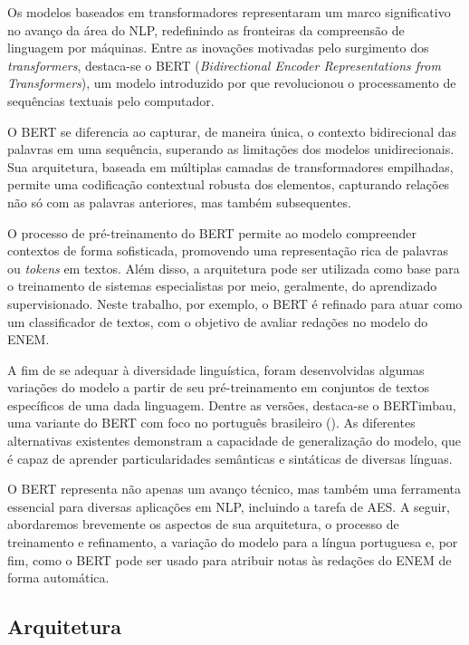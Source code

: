 Os modelos baseados em transformadores representaram um marco significativo no avanço da área do NLP, redefinindo as fronteiras da compreensão de linguagem por máquinas. Entre as inovações motivadas pelo surgimento dos \textit{transformers}, destaca-se o BERT (\textit{Bidirectional Encoder Representations from Transformers}), um modelo introduzido por \citet{bert2018} que revolucionou o processamento de sequências textuais pelo computador.

O BERT se diferencia ao capturar, de maneira única, o contexto bidirecional das palavras em uma sequência, superando as limitações dos modelos unidirecionais. Sua arquitetura, baseada em múltiplas camadas de transformadores empilhadas, permite uma codificação contextual robusta dos elementos, capturando relações não só com as palavras anteriores, mas também subsequentes.

O processo de pré-treinamento do BERT permite ao modelo compreender contextos de forma sofisticada, promovendo uma representação rica de palavras ou \textit{tokens} em textos. Além disso, a arquitetura pode ser utilizada como base para o treinamento de sistemas especialistas por meio, geralmente, do aprendizado supervisionado. Neste trabalho, por exemplo, o BERT é refinado para atuar como um classificador de textos, com o objetivo de avaliar redações no modelo do ENEM.

A fim de se adequar à diversidade linguística, foram desenvolvidas algumas variações do modelo a partir de seu pré-treinamento em conjuntos de textos específicos de uma dada linguagem. Dentre as versões, destaca-se o BERTimbau, uma variante do BERT com foco no português brasileiro (\cite{bertimbau2020}). As diferentes alternativas existentes demonstram a capacidade de generalização do modelo, que é capaz de aprender particularidades semânticas e sintáticas de diversas línguas.

O BERT representa não apenas um avanço técnico, mas também uma ferramenta essencial para diversas aplicações em NLP, incluindo a tarefa de AES. A seguir, abordaremos brevemente os aspectos de sua arquitetura, o processo de treinamento e refinamento, a variação do modelo para a língua portuguesa e, por fim, como o BERT pode ser usado para atribuir notas às redações do ENEM de forma automática.

\subsection{Arquitetura}

